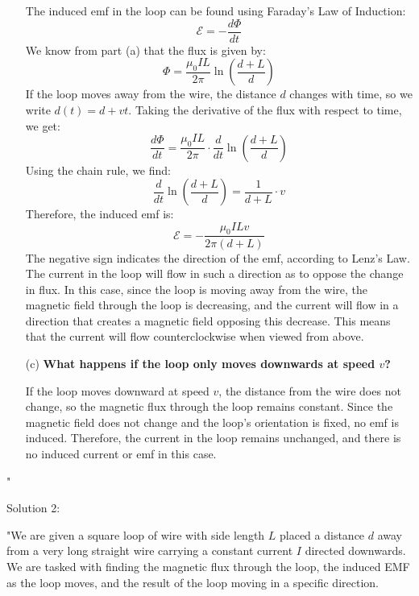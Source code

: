 \begin{enumerate}
    The induced emf in the loop can be found using Faraday's Law of Induction:
    \[
    \mathcal{E} = -\frac{d\Phi}{dt}
    \]
    We know from part (a) that the flux is given by:
    \[
    \Phi = \frac{\mu_0 I L}{2\pi} \ln \left( \frac{d+L}{d} \right)
    \]
    If the loop moves away from the wire, the distance $d$ changes with time, so we write $d(t) = d + vt$. Taking the derivative of the flux with respect to time, we get:
    \[
    \frac{d\Phi}{dt} = \frac{\mu_0 I L}{2\pi} \cdot \frac{d}{dt} \ln \left( \frac{d+L}{d} \right)
    \]
    Using the chain rule, we find:
    \[
    \frac{d}{dt} \ln \left( \frac{d+L}{d} \right) = \frac{1}{d+L} \cdot v
    \]
    Therefore, the induced emf is:
    \[
    \mathcal{E} = -\frac{\mu_0 I L v}{2\pi (d+L)}
    \]
    The negative sign indicates the direction of the emf, according to Lenz's Law. The current in the loop will flow in such a direction as to oppose the change in flux. In this case, since the loop is moving away from the wire, the magnetic field through the loop is decreasing, and the current will flow in a direction that creates a magnetic field opposing this decrease. This means that the current will flow counterclockwise when viewed from above.

    \item[(c)] \textbf{What happens if the loop only moves downwards at speed $v$?}
    
    If the loop moves downward at speed $v$, the distance from the wire does not change, so the magnetic flux through the loop remains constant. Since the magnetic field does not change and the loop's orientation is fixed, no emf is induced. Therefore, the current in the loop remains unchanged, and there is no induced current or emf in this case.
\end{enumerate}"

Solution 2:

"We are given a square loop of wire with side length $L$ placed a distance $d$ away from a very long straight wire carrying a constant current $I$ directed downwards. We are tasked with finding the magnetic flux through the loop, the induced EMF as the loop moves, and the result of the loop moving in a specific direction.

